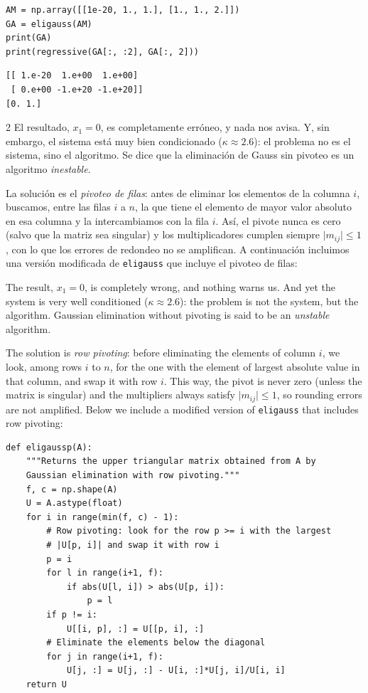 \begin{verbatim}
AM = np.array([[1e-20, 1., 1.], [1., 1., 2.]])
GA = eligauss(AM)
print(GA)
print(regressive(GA[:, :2], GA[:, 2]))
\end{verbatim}
\begin{verbatim}
[[ 1.e-20  1.e+00  1.e+00]
 [ 0.e+00 -1.e+20 -1.e+20]]
[0. 1.]
\end{verbatim}

\begin{paracol}{2}
El resultado, $x_1=0$, es completamente erróneo, y nada nos avisa. Y, sin embargo, el sistema está muy bien condicionado ($\kappa\approx 2.6$): el problema no es el sistema, sino el algoritmo. Se dice que la eliminación de Gauss sin pivoteo es un algoritmo \emph{inestable}.

La solución es el \emph{pivoteo de filas}: antes de eliminar los elementos de la columna $i$, buscamos, entre las filas $i$ a $n$, la que tiene el elemento de mayor valor absoluto en esa columna y la intercambiamos con la fila $i$. Así, el pivote nunca es cero (salvo que la matriz sea singular) y los multiplicadores cumplen siempre $\vert m_{ij}\vert\leq 1$, con lo que los errores de redondeo no se amplifican. A continuación incluimos una versión modificada de \texttt{eligauss} que incluye el pivoteo de filas:

\switchcolumn
The result, $x_1=0$, is completely wrong, and nothing warns us. And yet the system is very well conditioned ($\kappa\approx 2.6$): the problem is not the system, but the algorithm. Gaussian elimination without pivoting is said to be an \emph{unstable} algorithm.

The solution is \emph{row pivoting}: before eliminating the elements of column $i$, we look, among rows $i$ to $n$, for the one with the element of largest absolute value in that column, and swap it with row $i$. This way, the pivot is never zero (unless the matrix is singular) and the multipliers always satisfy $\vert m_{ij}\vert\leq 1$, so rounding errors are not amplified. Below we include a modified version of \texttt{eligauss} that includes row pivoting:
\end{paracol}

\begin{verbatim}
def eligaussp(A):
    """Returns the upper triangular matrix obtained from A by
    Gaussian elimination with row pivoting."""
    f, c = np.shape(A)
    U = A.astype(float)
    for i in range(min(f, c) - 1):
        # Row pivoting: look for the row p >= i with the largest
        # |U[p, i]| and swap it with row i
        p = i
        for l in range(i+1, f):
            if abs(U[l, i]) > abs(U[p, i]):
                p = l
        if p != i:
            U[[i, p], :] = U[[p, i], :]
        # Eliminate the elements below the diagonal
        for j in range(i+1, f):
            U[j, :] = U[j, :] - U[i, :]*U[j, i]/U[i, i]
    return U
\end{verbatim}

